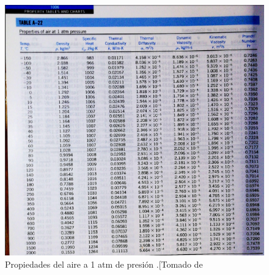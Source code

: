 \documentclass[12pt,letterpaper]{article}     %
\begin{document}
\begin{figure}[H]
\centering
\includegraphics[width=1.2\textwidth]{Imagines/propaire1atm.png}
\caption{Propiedades del aire a 1 atm de presión .[Tomado de \cite[p\ 1006]{yunus}}
\label{fig:propiedadesaire}
\end{figure}
\end{document}
